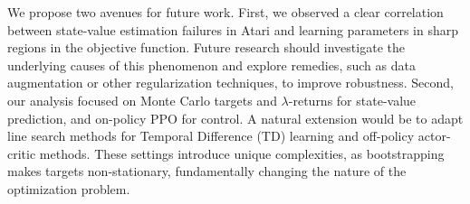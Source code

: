 \documentclass[10pt]{article} %
\begin{document}
We propose two avenues for future work. First, we observed a clear correlation between state-value estimation failures in Atari and learning parameters in sharp regions in the objective function. Future research should investigate the underlying causes of this phenomenon and explore remedies, such as data augmentation or other regularization techniques, to improve robustness. Second, our analysis focused on Monte Carlo targets and $\lambda$-returns for state-value prediction, and on-policy PPO for control. A natural extension would be to adapt line search methods for Temporal Difference (TD) learning and off-policy actor-critic methods. These settings introduce unique complexities, as bootstrapping makes targets non-stationary, fundamentally changing the nature of the optimization problem. %










\end{document}
